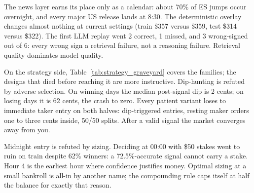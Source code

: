The news layer earns its place only as a calendar: about 70\% of ES jumps
occur overnight, and every major US release lands at 8:30. The
deterministic overlay changes almost nothing at current settings (train
\$357 versus \$359, test \$314 versus \$322). The first LLM replay went 2
correct, 1 missed, and 3 wrong-signed out of 6: every wrong sign a
retrieval failure, not a reasoning failure. Retrieval quality dominates
model quality.

On the strategy side, Table~\ref{tab:strategy_graveyard} covers the
families; the designs that died before reaching it are more instructive.
Dip-hunting is refuted by adverse selection. On winning days the median
post-signal dip is 2 cents; on losing days it is 62 cents, the crash to
zero. Every patient variant loses to immediate taker entry on both
halves: dip-triggered entries, resting maker orders one to three cents
inside, 50/50 splits. After a valid signal the market converges
away from you.

Midnight entry is refuted by sizing. Deciding at 00:00 with \$50 stakes
went to ruin on train despite 62\% winners: a 72.5\%-accurate signal
cannot carry a stake. Hour 4 is the earliest hour where confidence
justifies money. Optimal sizing at a small bankroll is all-in by another
name; the compounding rule caps itself at half the balance for exactly
that reason.
